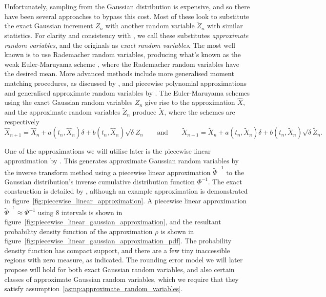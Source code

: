 \documentclass[manuscript,review]{acmart}
\begin{document}
Unfortunately, sampling from the Gaussian distribution is expensive, and so there have been several approaches to bypass this cost. Most of these look to substitute the exact Gaussian increment $ Z_n $ with another random variable $ \widetilde{Z}_n $ with similar statistics. For clarity and consistency with \citeauthor{giles2020approximate} \citep{giles2020approximate,sheridan2020approximate_inverse,giles2020approximating}, we call these substitutes \emph{approximate random variables}, and the originals as \emph{exact random variables}. The most well known is to use Rademacher random variables, producing what's known as the weak Euler-Maruyama scheme \citep[page~XXXII]{kloeden1999numerical}, where the Rademacher random variables have the desired mean. More advanced methods include more generalised moment matching procedures, as discussed by \citet{muller1958inverse}, and piecewise polynomial approximations and generalised approximate random variables by \citeauthor{giles2020approximate} \citep{giles2020approximate,sheridan2020approximate_inverse}. The Euler-Maruyama schemes using the exact Gaussian random variables $ Z_n $ give rise to the approximation $ \widehat{X} $, and the approximate random variables $ \widetilde{Z}_n $ produce $ \widetilde{X} $, where the schemes are respectively 
\begin{equation*}
\widehat{X}_{n+1} = \widehat{X}_n + a(t_n, \widehat{X}_n) \delta + b(t_n, \widehat{X}_n)\sqrt{\delta} Z_n
\qquad \text{and} \qquad 
\widetilde{X}_{n+1} = \widetilde{X}_n + a(t_n, \widetilde{X}_n) \delta + b(t_n, \widetilde{X}_n)\sqrt{\delta} \widetilde{Z}_n.
\end{equation*}

One of the approximations we will utilise later is the piecewise linear approximation by \citet{giles2020approximating}. This generates approximate Gaussian random variables by the inverse transform method \citep{glasserman2013monte} using a piecewise linear approximation $ \widetilde{\Phi}^{-1} $ to the Gaussian distribution's inverse cumulative distribution function $ \Phi^{-1} $. The exact construction is detailed by \citet{giles2020approximating}, although an example approximation is demonstrated in figure~\ref{fig:piecewise_linear_approximation}. A piecewise linear approximation $ \widetilde{\Phi}^{-1} \approx \Phi^{-1} $ using 8 intervals is shown in figure~\ref{fig:piecewise_linear_gaussian_approximation}, and the resultant probability density function of the approximation $ \rho $ is shown in figure~\ref{fig:piecewise_linear_gaussian_approximation_pdf}. The probability density function has compact support, and there are a few tiny inaccessible regions with zero measure, as indicated. The rounding error model we will later propose will hold for both exact Gaussian random variables, and also certain classes of approximate Gaussian random variables, which we require that they satisfy assumption~\ref{asmp:approximate_random_variables}.
\end{document}
